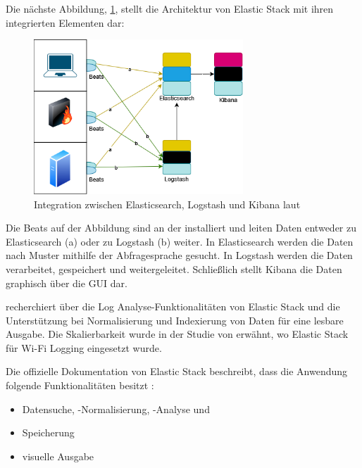 \newpage
Die nächste Abbildung, \ref{fig:Intregation_ELK}, stellt die Architektur von Elastic Stack mit ihren integrierten Elementen dar:

\begin{figure}[H]
   \centering
   \includegraphics[width=0.7\textwidth]{assets/ElasticStack.drawio.png}
   \caption[Integration zwischen Elasticsearch, Logstash und Kibana]
   {Integration zwischen Elasticsearch, Logstash und Kibana laut \cite{packt_elkstack} }
   \label{fig:Intregation_ELK}
   \centering
\end{figure}

Die Beats auf der Abbildung sind an der  installiert und leiten Daten entweder zu Elasticsearch (a) oder zu Logstash (b) weiter. In Elasticsearch werden die Daten nach Muster mithilfe der Abfragesprache  gesucht. In Logstash werden die Daten verarbeitet, gespeichert und weitergeleitet. Schließlich stellt Kibana die Daten graphisch über die \gls{GUI} dar\citep{Jain_LMELK}.

\cite{Advani_elkstakc} recherchiert über die Log Analyse-Funktionalitäten von Elastic Stack und die Unterstützung bei Normalisierung und Indexierung von Daten für eine lesbare Ausgabe. Die Skalierbarkeit wurde in der Studie von \cite{Wang_elkwifi} erwähnt, wo Elastic Stack für Wi-Fi Logging eingesetzt wurde.

Die offizielle Dokumentation von Elastic Stack beschreibt, dass die Anwendung folgende Funktionalitäten besitzt \citep{elastic_docs}:

\begin{itemize}[noitemsep]
   \item Datensuche, -Normalisierung, -Analyse und
   \item Speicherung
   \item visuelle Ausgabe
\end{itemize}

